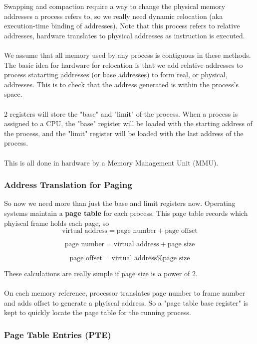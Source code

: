\documentclass{article}
\begin{document}
Swapping and compaction require a way to change the physical memory addresses a process refers to, so we really need dynamic relocation (aka execution-time binding of addresses). Note that this process refers to relative addresses, hardware translates to physical addresses as instruction is executed.\\
\\
We assume that all memory used by any process is contiguous in these methods. The basic idea for hardware for relocation is that we add relative addresses to process statarting addresses (or base addresses) to form real, or physical, addresses. This is to check that the address generated is within the process's space.\\
\\
2 registers will store the "base" and "limit" of the process. When a process is assigned to a CPU, the "base" register will be loaded with the starting address of the process, and the "limit" register will be loaded with the last address of the process.\\
\\
This is all done in hardware by a Memory Management Unit (MMU).

\subsubsection{Address Translation for Paging}

So now we need more than just the base and limit registers now. Operating systems maintain a \textbf{page table} for each process. This page table records which phyiscal frame holds each page, so
$$\text{virtual address} = \text{page number} + \text{page offset}$$

$$\text{page number} = \text{virtual address} + \text{page size}$$

$$\text{page offset} = \text{virtual address} \% \text{page size}$$

These calculations are really simple if page size is a power of 2.\\
\\
On each memory reference, processor translates page number to frame number and adds offset to generate a phyiscal address. So a "page table base register" is kept to quickly locate the page table for the running process.

\subsubsection{Page Table Entries (PTE)}
\end{document}
